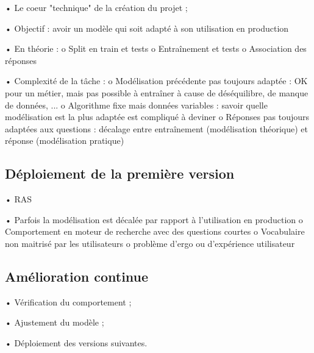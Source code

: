             •	Le coeur "technique" de la création du projet ;

            •	Objectif : avoir un modèle qui soit adapté à son utilisation en production

            •	En théorie :
                o	Split en train et tests
                o	Entraînement et tests
                o	Association des réponses

            •   Complexité de la tâche :
                o	Modélisation précédente pas toujours adaptée : OK pour un métier, mais pas possible à entraîner à cause de déséquilibre, de manque de données, ...
                o	Algorithme fixe mais données variables : savoir quelle modélisation est la plus adaptée est compliqué à deviner
                o	Réponses pas toujours adaptées aux questions : décalage entre entraînement (modélisation théorique) et réponse (modélisation pratique)

        \subsection{Déploiement de la première version}

            •	RAS

            •	Parfois la modélisation est décalée par rapport à l'utilisation en production
                o	Comportement en moteur de recherche avec des questions courtes
                o	Vocabulaire non maitrisé par les utilisateurs
                o	problème d'ergo ou d'expérience utilisateur
            

        \subsection{Amélioration continue}

            •	Vérification du comportement ;

            •	Ajustement du modèle ;

            •	Déploiement des versions suivantes.
            

